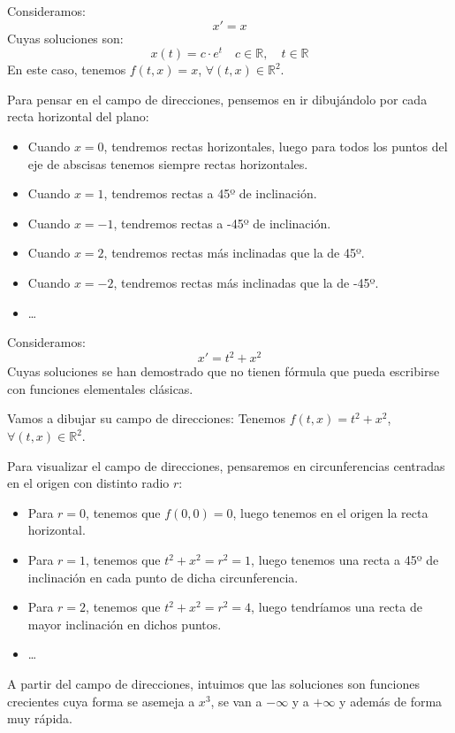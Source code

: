 \begin{ejemplo}
    Consideramos:
    \begin{equation*}
        x'=x
    \end{equation*}
    Cuyas soluciones son:
    \begin{equation*}
        x(t) = c\cdot e^{t} \quad c\in \mathbb{R}, \quad t\in \mathbb{R}
    \end{equation*}
    En este caso, tenemos $f(t,x)=x$, $\forall (t,x)\in \mathbb{R}^2$.

    Para pensar en el campo de direcciones, pensemos en ir dibujándolo por cada recta horizontal del plano:
    \begin{itemize}
        \item Cuando $x=0$, tendremos rectas horizontales, luego para todos los puntos del eje de abscisas tenemos siempre rectas horizontales.
        \item Cuando $x=1$, tendremos rectas a 45º de inclinación.
        \item Cuando $x=-1$, tendremos rectas a -45º de inclinación.
        \item Cuando $x=2$, tendremos rectas más inclinadas que la de 45º.
        \item Cuando $x=-2$, tendremos rectas más inclinadas que la de -45º.
        \item \ldots
    \end{itemize}
\end{ejemplo}

\begin{ejemplo}
    Consideramos:
    \begin{equation*}
        x' = t^2 + x^2
    \end{equation*}
    Cuyas soluciones se han demostrado que no tienen fórmula que pueda escribirse con funciones elementales clásicas.

    Vamos a dibujar su campo de direcciones:
    Tenemos $f(t,x) = t^2 + x^2$, $\forall (t,x)\in \mathbb{R}^2$. 

    Para visualizar el campo de direcciones, pensaremos en circunferencias centradas en el origen con distinto radio $r$:
    \begin{itemize}
        \item Para $r = 0$, tenemos que $f(0,0) = 0$, luego tenemos en el origen la recta horizontal.
        \item Para $r = 1$, tenemos que $t^2 + x^2 = r^2 = 1$, luego tenemos una recta a 45º de inclinación en cada punto de dicha circunferencia.
        \item Para $r = 2$, tenemos que $t^2 + x^2 = r^2 = 4$, luego tendríamos una recta de mayor inclinación en dichos puntos.
        \item \ldots
    \end{itemize}
    A partir del campo de direcciones, intuimos que las soluciones son funciones crecientes cuya forma se asemeja a $x^3$, se van a $-\infty$ y a $+\infty$ y además de forma muy rápida.
\end{ejemplo}

